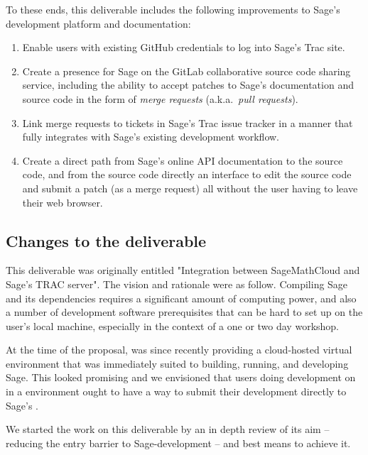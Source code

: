 To these ends, this deliverable includes the following improvements to Sage's
development platform and documentation:
\begin{enumerate}
\item Enable users with existing GitHub credentials to log into Sage's
    Trac site.
\item Create a presence for Sage on the GitLab collaborative source code
    sharing service, including the ability to accept patches to Sage's
    documentation and source code in the form of {\em merge requests}
    (a.k.a.~{\em pull requests}).
\item Link \GitLab merge requests to tickets in Sage's Trac issue tracker in
    a manner that fully integrates with Sage's existing development workflow.
\item Create a direct path from Sage's online API documentation to the source
    code, and from the source code directly an interface to edit the source
    code and submit a patch (as a merge request) all without the user having to
    leave their web browser.
\end{enumerate}



\hypertarget{changes-to-deliverable}{%
\subsection{Changes to the deliverable\label{changes-to-deliverable}}}


This deliverable was originally entitled "Integration between
SageMathCloud and Sage's TRAC server". The vision and rationale were
as follow. Compiling Sage and its dependencies requires a significant
amount of computing power, and also a number of development software
prerequisites that can be hard to set up on the user's local machine,
especially in the context of a one or two day workshop.

At the time of the proposal, \cocalc was since recently providing a
cloud-hosted virtual environment that was immediately suited to
building, running, and developing Sage. This looked promising and we
envisioned that users doing development on \Sage in a \cocalc
environment ought to have a way to submit their development directly
to Sage's \Trac.

We started the work on this deliverable by an in depth review of its
aim -- reducing the entry barrier to Sage-development -- and best
means to achieve it.

